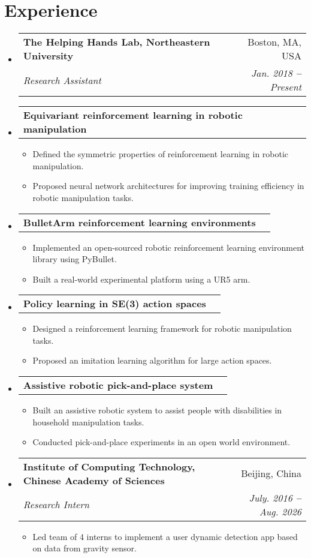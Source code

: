 \documentclass[letterpaper,11pt]{article}
\makeatletter
\newcommand{\resumeItem}[1]{
  \item\small{
    {#1 \vspace{-2pt}}
  }
}
\newcommand{\resumeSubheading}[4]{
  \vspace{-4pt}\item
    \begin{tabular*}{0.97\textwidth}[t]{l@{\extracolsep{\fill}}r}
      \textbf{\small#1} & \small#2 \\
      \textit{\small#3} & \textit{\small #4} \\
    \end{tabular*}\vspace{-7pt}
}
\newcommand{\resumeProjectHeading}[2]{
    \vspace{-7pt}\item
    \begin{tabular*}{0.97\textwidth}{l@{\extracolsep{\fill}}r}
      \hspace{13pt}\small#1 & #2 \\
    \end{tabular*}\vspace{-7pt}
}
\newcommand{\resumeSubHeadingListStart}{\begin{itemize}[leftmargin=0.15in, label={}]}
\newcommand{\resumeSubHeadingListEnd}{\end{itemize}}
\newcommand{\resumeItemListStart}{\begin{itemize}}
\newcommand{\resumeItemListEnd}{\end{itemize}\vspace{-5pt}}
\makeatother
\begin{document}
\section{Experience}
\resumeSubHeadingListStart
\vspace{2pt}
\resumeSubheading
{The Helping Hands Lab, Northeastern University}{Boston, MA, USA}
{Research Assistant}{Jan. 2018 \textbf{--} Present}
\resumeProjectHeading{\textbf{Equivariant reinforcement learning in robotic manipulation}}{}
\resumeItemListStart
\resumeItem{Defined the symmetric properties of reinforcement learning in robotic manipulation. }
\resumeItem{Proposed neural network architectures for improving training efficiency in robotic manipulation tasks.}
\resumeItemListEnd

\resumeProjectHeading{\textbf{BulletArm reinforcement learning environments}}{}
\resumeItemListStart
\resumeItem{Implemented an open-sourced robotic reinforcement learning environment library using PyBullet.}
\resumeItem{Built a real-world experimental platform using a UR5 arm.}
\resumeItemListEnd

\resumeProjectHeading{\textbf{Policy learning in SE(3) action spaces}}{}
\resumeItemListStart
\resumeItem{Designed a reinforcement learning framework for robotic manipulation tasks.}
\resumeItem{Proposed an imitation learning algorithm for large action spaces.}
\resumeItemListEnd

\resumeProjectHeading{\textbf{Assistive robotic pick-and-place system}}{}
\resumeItemListStart
\resumeItem{Built an assistive robotic system to assist people with disabilities in household manipulation tasks.}
\resumeItem{Conducted pick-and-place experiments in an open world environment.}
\resumeItemListEnd

\resumeSubheading
{Institute of Computing Technology, Chinese Academy of Sciences}{Beijing, China}
{Research Intern}{July. 2016 \textbf{--} Aug. 2026}
\resumeItemListStart
\resumeItem{Led team of 4 interns to implement a user dynamic detection app based on data from gravity sensor.}
\resumeItemListEnd
\resumeSubHeadingListEnd
\end{document}
